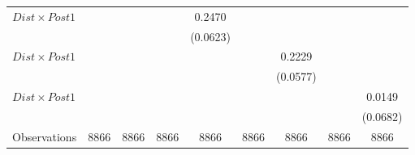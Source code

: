 {\begin{tabular}{l*{8}{c}}
\addlinespace
$ Dist \times Post1$&                  &                  &                  &   0.2470\sym{***}&                  &                  &                  &                  \\
                &                  &                  &                  & (0.0623)         &                  &                  &                  &                  \\
\addlinespace
$ Dist \times Post1$&                  &                  &                  &                  &                  &   0.2229\sym{***}&                  &                  \\
                &                  &                  &                  &                  &                  & (0.0577)         &                  &                  \\
\addlinespace
$ Dist \times Post1$&                  &                  &                  &                  &                  &                  &                  &   0.0149         \\
                &                  &                  &                  &                  &                  &                  &                  & (0.0682)         \\
\midrule
Observations    &     8866         &     8866         &     8866         &     8866         &     8866         &     8866         &     8866         &     8866         \\
\bottomrule
\end{tabular}
}
